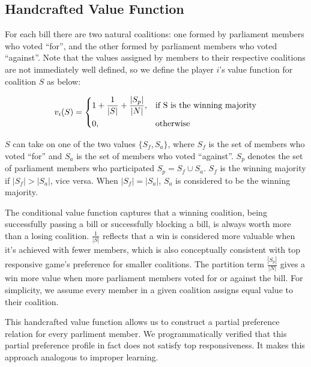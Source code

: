 \documentclass[letterpaper]{article} %
\begin{document}
\subsection{Handcrafted Value Function}
For each bill there are two natural coalitions: one formed by parliament members who voted ``for'', and the other formed by parliament members who voted ``against''. Note that the values assigned by members to their respective coalitions are not immediately well defined, so we define the player $i$'s value function for coalition $S$ as below:

\[
  v_i(S) = 
  \begin{dcases}
      1 + \frac{1}{|S|} + \frac{|S_p|}{|N|},& \text{if S is the winning majority}\\
      0,              & \text{otherwise}
  \end{dcases}
\]

$S$ can take on one of the two values $\{S_f, S_a\}$, where $S_f$ is the set of members who voted ``for'' and $S_a$ is the set of members who voted ``against''. $S_p$ denotes the set of parliament members who participated $S_p = S_f \cup S_a$. $S_f$ is the winning majority if $|S_f| > |S_a|$, vice versa. When $|S_f| = |S_a|$, $S_a$ is considered to be the winning majority.

The conditional value function captures that a winning coalition, being successfully passing a bill or successfully blocking a bill, is always worth more than a losing coalition. $\frac{1}{|S|}$ reflects that a win is considered more valuable when it's achieved with fewer members, which is also conceptually consistent with top responsive game's preference for smaller coalitions. The partition term $\frac{|S_p|}{|N|}$ gives a win more value when more parliament members voted for or against the bill. For simplicity, we assume every member in a given coalition assigns equal value to their coalition.

This handcrafted value function allows us to construct a partial preference relation for every parliment member. We programmatically verified that this partial preference profile in fact does not satisfy top responsiveness. It makes this approach analogous to improper learning.
\end{document}
